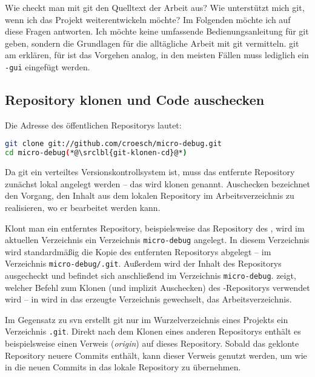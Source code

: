 Wie checkt man mit \gls{git} den Quelltext der Arbeit aus? Wie unterstützt mich \gls{git}, wenn ich das Projekt weiterentwickeln möchte? Im Folgenden möchte ich auf diese Fragen antworten. Ich möchte keine umfassende Bedienungsanleitung für \gls{git} geben, sondern die Grundlagen für die alltägliche Arbeit mit \gls{git} vermitteln. \gls{git} am \md erklären, für \mdg ist das Vorgehen analog, in den meisten Fällen muss lediglich ein \texttt{-gui} eingefügt werden.

\subsection{Repository klonen und Code auschecken}
Die Adresse des öffentlichen Repositorys lautet: 

\begin{lstlisting}[language=sh,caption={\md mit git klonen},label=\lstlbl{git-klonen}]
git clone git://github.com/croesch/micro-debug.git
cd micro-debug(*@\srclbl{git-klonen-cd}@*)
\end{lstlisting}

Da \gls{git} ein verteiltes Versionskontrollsystem ist, muss das entfernte Repository zunächst lokal angelegt werden -- das wird klonen genannt. Auschecken bezeichnet den Vorgang, den Inhalt aus dem lokalen Repository im Arbeitsverzeichnis zu realisieren, wo er bearbeitet werden kann.

Klont man ein entferntes Repository, beispielsweise das Repository des \md, wird im aktuellen Verzeichnis ein Verzeichnis \texttt{micro-debug} angelegt. In diesem Verzeichnis wird standardmäßig die Kopie des entfernten Repositorys abgelegt -- im Verzeichnis \texttt{micro-debug/.git}. Außerdem wird der Inhalt des Repositorys ausgecheckt und befindet sich anschließend im Verzeichnis \texttt{micro-debug}.  zeigt, welcher Befehl zum Klonen (und implizit Auschecken) des \md-Repositorys verwendet wird -- in  wird in das erzeugte Verzeichnis gewechselt, das Arbeitsverzeichnis.

Im Gegensatz zu \gls{svn} erstellt \gls{git} nur im Wurzelverzeichnis eines Projekts ein Verzeichnis \texttt{.git}. Direkt nach dem Klonen eines anderen Repositorys enthält es beispielsweise einen Verweis (\emph{origin}) auf dieses Repository. Sobald das geklonte Repository neuere Commits enthält, kann dieser Verweis genutzt werden, um wie in  die neuen Commits in das lokale Repository zu übernehmen.

